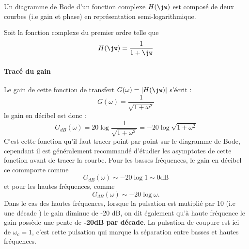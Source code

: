 Un diagramme de Bode d'un fonction complexe $H(\jw)$ est composé de deux courbes (i.e gain et phase) 
en représentation semi-logarithmique.

Soit la fonction complexe du premier ordre telle que 
\begin{align}
H(\jw)=\dfrac{1}{1+\jw}\label{eq-ft_annexe}
\end{align}

\paragraph{Tracé du gain}
Le gain de cette fonction de transfert $G(\omega)=|H(\jw)|$ s'écrit :
$$
G(\omega)=\dfrac{1}{\sqrt{1+\omega^2}}
$$
le gain en décibel est donc :
$$
G_{dB}(\omega)=20\log{\dfrac{1}{\sqrt{1+\omega^2}}}=-20\log{\sqrt{1+\omega^2}}
$$
C'est cette fonction qu'il faut tracer point par point sur le diagramme de Bode, cependant il est généralement 
recommandé d'étudier les asymptotes de cette fonction avant de tracer la courbe. 
Pour les basses fréquences, le gain en décibel ce commporte comme 
$$
G_{dB}(\omega)\sim-20\log{1}\sim 0\text{dB}
$$ 
et pour les hautes fréquences, comme
$$
G_{dB}(\omega)\sim -20\log{\omega}.
$$
Dans le cas des hautes fréquences, lorsque la pulsation est mutiplié 
par 10 (i.e une décade ) le gain diminue de -20 dB, 
on dit également qu'à haute fréquence le gain possède une pente de \textbf{-20dB par décade}. 
La pulsation de coupure est ici de $\omega_{c}=1$, c'est cette pulsation qui marque la \og séparation\fg 
entre basses et hautes fréquences. 

